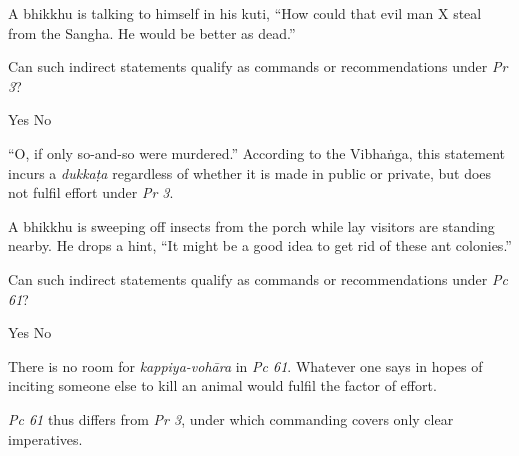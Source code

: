 \begin{exam}{\autoExamName}
\begin{problem}
\end{problem}

\problemDivide

\begin{problem}

  A bhikkhu is talking to himself in his kuti, ``How could that evil man X steal from the Sangha. He would be better as dead.''

  Can such indirect statements qualify as commands or recommendations under \emph{Pr 3}?

  \bigskip

  \begin{answers}{2}
    \bChoices
     Yes\eAns
     No\eAns
    \eChoices
  \end{answers}

  \begin{solution}
    ``O, if only so-and-so were murdered.'' According to the Vibhaṅga, this statement incurs a \emph{dukkaṭa} regardless of whether it is made in public or private, but does not fulfil effort under \emph{Pr 3}.
  \end{solution}

\end{problem}

\problemDivide

\begin{problem}
  A bhikkhu is sweeping off insects from the porch while lay visitors are standing nearby.
  He drops a hint, ``It might be a good idea to get rid of these ant colonies.''

  Can such indirect statements qualify as commands or recommendations under \emph{Pc 61}?

  \bigskip

  \begin{answers}{2}
    \bChoices
     Yes\eAns
     No\eAns
    \eChoices
  \end{answers}

  \begin{solution}
    There is no room for \emph{kappiya-vohāra} in \emph{Pc 61}. Whatever one says in hopes of inciting someone else to kill an animal would fulfil the factor of effort.

    \emph{Pc 61} thus differs from \emph{Pr 3}, under which commanding covers only clear imperatives.
  \end{solution}

\end{problem}

\ifnosolutions
\clearpage
\fi


\end{exam}
